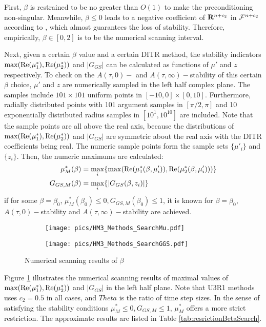 \documentclass[preprint,12pt]{elsarticle}
\begin{document}
First, $\beta$ is restrained to be no greater than $O(1)$ to make
the preconditioning non-singular.
Meanwhile, $\beta\leq 0$ leads to a negative coefficient of $\mathbf{R}^{n+c_2}$
in $\mathcal{F}^{n+c_2}$ according to , which almost
guarantees the loss of stability. Therefore, empirically, $\beta\in[0,2]$
is to be the numerical scanning interval.

Next, given a certain $\beta$ value and a certain DITR method, the
stability indicators $\max(\mathrm{Re}(\mu^*_1),\mathrm{Re}(\mu^*_2))$ and $|G_{GS}|$
can be calculated as functions of $\mu'$ and $z$ respectively.
To check on the $A(\tau,0)-$ and $A(\tau,\infty)-$stability of this
certain $\beta$ choice, $\mu'$ and $z$ are numerically sampled
in the left half complex plane. The samples include $101\times101$
uniform points in $[-10,0]\times[0,10]$. Furthermore, radially distributed
points with 101 argument samples in $[\pi/2,\pi]$ and 10 exponentially
distributed radius samples in $[10^1, 10^{10}]$ are included.
Note that the sample points are all above the real axis, because the
distributions of $\max(\mathrm{Re}(\mu^*_1),\mathrm{Re}(\mu^*_2))$ and $|G_{GS}|$
are symmetric about the real axis with the DITR coefficients being real.
The numeric sample points form the sample
sets $\{\mu'_i\}$ and $\{z_i\}$. Then, the numeric maximums are
calculated:
\begin{equation}
    \begin{aligned}
        \mu^*_{M}(\beta) & = \max_{i}\{\max(\mathrm{Re}(\mu^*_1(\beta,\mu'_i)),\mathrm{Re}(\mu^*_2(\beta,\mu'_i)))\} \\
        G_{GS,M}(\beta)  & = \max_{i}\{|G_{GS}(\beta,z_i)|\}
    \end{aligned}
\end{equation}
if for some $\beta=\beta_0$, $\mu^*_{M}(\beta_0) \leq 0,G_{GS,M}(\beta_0) \leq 1$,
it is known for  $\beta=\beta_0$, $A(\tau,0)-$stability and
$A(\tau,\infty)-$stability are achieved.


\begin{figure}[htbp]
    \centering
    \begin{subfigure}{0.5\textwidth}
        \texttt{[image: pics/HM3\_Methods\_SearchMu.pdf]}
    \end{subfigure}\hfill
    \begin{subfigure}{0.5\textwidth}
        \texttt{[image: pics/HM3\_Methods\_SearchGGS.pdf]}
    \end{subfigure}
    \caption{Numerical scanning results of $\beta$}
    \label{fig:MuGGSSearch}
\end{figure}
Figure \ref{fig:MuGGSSearch} illustrates the numerical scanning
results of maximal values of
$\max(\mathrm{Re}(\mu^*_1),\mathrm{Re}(\mu^*_2))$ and $|G_{GS}|$ in the left
half plane. Note that U3R1 methods uses $c_2=0.5$ in all cases, and $Theta$ is
the ratio of time step sizes.
In the sense of satisfying the stability conditions $\mu^*_{M} \leq 0,G_{GS,M} \leq 1$,
$\mu^*_{M}$ offers a more strict restriction.
The approximate results are listed in Table \ref{tab:resrictionBetaSearch}.
\end{document}
